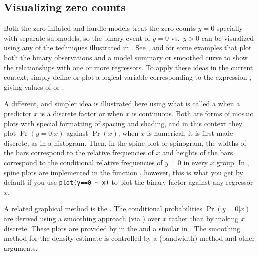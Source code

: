 \documentclass[11pt]{book}\usepackage[]{graphicx}\usepackage[]{color}
\begin{document}
\subsection{Visualizing zero counts}\label{sec:glm-viszero}

Both the zero-inflated and hurdle models treat the zero counts $y=0$ specially with separate
submodels, so the binary event of $y=0$ vs.\ $y>0$ can be visualized using any of the techniques
illustrated in .  See , 
and  for some examples that plot both the binary observations
and a model summary or smoothed curve to show the relationships with one or more
regressors.  To apply these ideas in the current context, simply define or plot a logical
variable corresponding to the expression , giving values of  or .

A different, and simpler idea is illustrated here using what is called a 
\cite{Hummel:96} when a predictor $x$ is a discrete factor or  when $x$ is
continuous.  Both are forms of mosaic plots with special formatting of spacing and shading,
and in this context they plot $\Pr(y=0 | x)$ against $\Pr(x)$; when $x$ is numerical, it
is first made discrete, as in a histogram.
Then, in the spine plot or spinogram, the widths of the bars correspond to the relative frequencies of $x$
and heights of the bars correspond to the conditional relative frequencies of $y=0$ in every $x$ group.
In \R, spine plots are implemented in the function , however, this is what you
get by default if you use \verb|plot(y==0 ~ x)| to plot the binary factor against any regressor $x$.

A related graphical method is the 
\citep{HofmannTheus:2005}. The conditional probabilities $\Pr(y=0 | x)$ are derived using
a smoothing approach (via ) over $x$ rather than by making $x$ discrete.
These plots are provided by  in the  and a similar
 in .  The smoothing method for the density estimate is controlled
by a  (bandwidth) method and other arguments.
\end{document}
